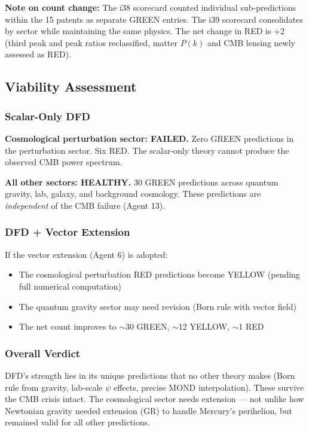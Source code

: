 \documentclass[11pt,a4paper]{article}
\begin{document}
\textbf{Note on count change:} The i38 scorecard counted individual sub-predictions within the 15 patents as separate GREEN entries. The i39 scorecard consolidates by sector while maintaining the same physics. The net change in RED is +2 (third peak and peak ratios reclassified, matter $P(k)$ and CMB lensing newly assessed as RED).

\subsection{Viability Assessment}

\subsubsection{Scalar-Only DFD}

\textbf{Cosmological perturbation sector: FAILED.} Zero GREEN predictions in the perturbation sector. Six RED. The scalar-only theory cannot produce the observed CMB power spectrum.

\textbf{All other sectors: HEALTHY.} 30 GREEN predictions across quantum gravity, lab, galaxy, and background cosmology. These predictions are \emph{independent} of the CMB failure (Agent 13).

\subsubsection{DFD + Vector Extension}

If the vector extension (Agent 6) is adopted:
\begin{itemize}
\item The cosmological perturbation RED predictions become YELLOW (pending full numerical computation)
\item The quantum gravity sector may need revision (Born rule with vector field)
\item The net count improves to $\sim$30 GREEN, $\sim$12 YELLOW, $\sim$1 RED
\end{itemize}

\subsubsection{Overall Verdict}

DFD's strength lies in its unique predictions that no other theory makes (Born rule from gravity, lab-scale $\psi$ effects, precise MOND interpolation). These survive the CMB crisis intact. The cosmological sector needs extension --- not unlike how Newtonian gravity needed extension (GR) to handle Mercury's perihelion, but remained valid for all other predictions.
\end{document}

